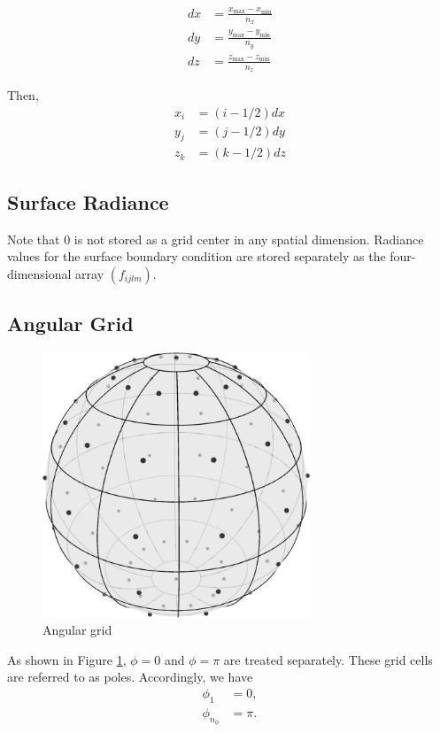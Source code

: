 \documentclass[10pt]{article}
\begin{document}
\begin{align}
  dx &= \frac{x_{\max}-x_{\min}}{n_x} \\ 
  dy &= \frac{y_{\max}-y_{\min}}{n_y} \\ 
  dz &= \frac{z_{\max}-z_{\min}}{n_z}
\end{align}

Then,
\begin{align}
  x_i &= (i-1/2)dx \\
  y_j &= (j-1/2)dy \\
  z_k &= (k-1/2)dz
\end{align}

\subsection{Surface Radiance}
Note that $0$ is not stored as a grid center in any spatial dimension.
Radiance values for the surface boundary condition are stored
separately as the four-dimensional array $\left(f_{ijlm}\right)$.

\subsection{Angular Grid}
\begin{figure}[H]
  \centering
  \includegraphics[width=8cm]{angulargrid.pdf}
  \caption{Angular grid}
  \label{fig:angular_grid}
\end{figure}

As shown in Figure \ref{fig:angular_grid}, $\phi=0$ and $\phi=\pi$ are treated
separately.
These grid cells are referred to as poles.
Accordingly, we have 
\begin{align}
  \phi_1 &= 0, \\
  \phi_{n_\phi} &= \pi.
\end{align}
\end{document}
